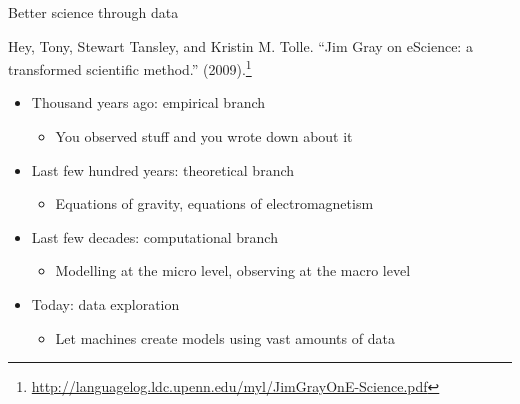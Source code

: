 \documentclass[obeyspaces,aspectratio=43]{beamer}
\renewcommand{\href}[2]{#2\footnote{\url{#1}}}
\providecommand{\tightlist}{%
  \setlength{\itemsep}{0pt}\setlength{\parskip}{0pt}}
\begin{document}
\begin{frame}{Better science through data}

\href{http://languagelog.ldc.upenn.edu/myl/JimGrayOnE-Science.pdf}{Hey,
Tony, Stewart Tansley, and Kristin M. Tolle. ``Jim Gray on eScience: a
transformed scientific method.'' (2009).}

\begin{itemize}
\tightlist
\item
  Thousand years ago: empirical branch

  \begin{itemize}
  \tightlist
  \item
    You observed stuff and you wrote down about it
  \end{itemize}
\item
  Last few hundred years: theoretical branch

  \begin{itemize}
  \tightlist
  \item
    Equations of gravity, equations of electromagnetism
  \end{itemize}
\item
  Last few decades: computational branch

  \begin{itemize}
  \tightlist
  \item
    Modelling at the micro level, observing at the macro level
  \end{itemize}
\item
  Today: data exploration

  \begin{itemize}
  \tightlist
  \item
    Let machines create models using vast amounts of data
  \end{itemize}
\end{itemize}

\end{frame}
\end{document}
